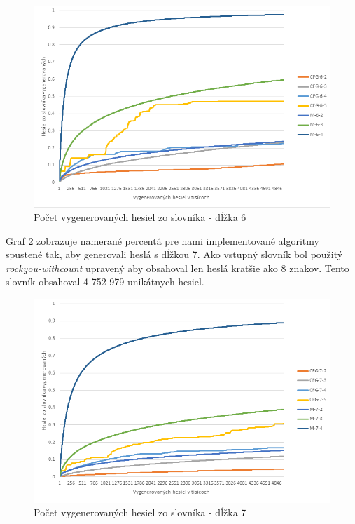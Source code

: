 \begin{figure}[ht]
    \centering
    \includegraphics[width=1\textwidth]{sameDictAcc6}
    \caption{Počet vygenerovaných hesiel zo slovníka - dĺžka 6}
    \label{fig:Acc6}
\end{figure}

\pargraph{}
Graf \ref{fig:Acc7} zobrazuje namerané percentá pre nami implementované algoritmy spustené tak, aby generovali heslá s dĺžkou 7. Ako vstupný slovník bol použitý \emph{rockyou-withcount} upravený aby obsahoval len heslá kratšie ako 8 znakov. Tento slovník obsahoval 4 752 979 unikátnych hesiel.

\begin{figure}[ht]
    \centering
    \includegraphics[width=1\textwidth]{sameDictAcc7}
    \caption{Počet vygenerovaných hesiel zo slovníka - dĺžka 7}
    \label{fig:Acc7}
\end{figure}

